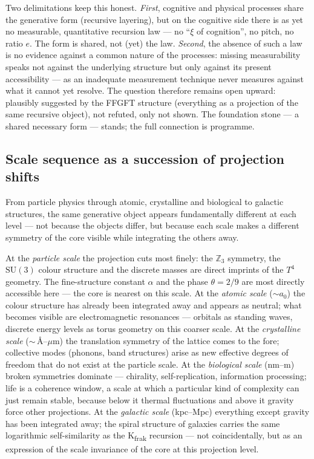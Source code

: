Two delimitations keep this honest. \emph{First}, cognitive and physical
processes share the generative form (recursive layering), but on the cognitive
side there is as yet no measurable, quantitative recursion law --- no
\enquote{$\xi$ of cognition}, no pitch, no ratio $e$. The form is shared, not
(yet) the law. \emph{Second}, the absence of such a law is no evidence against
a common nature of the processes: missing measurability speaks not against the
underlying structure but only against its present accessibility --- as an
inadequate measurement technique never measures against what it cannot yet
resolve. The question therefore remains open upward: plausibly suggested by
the FFGFT structure (everything as a projection of the same recursive object),
not refuted, only not shown. The foundation stone --- a shared necessary form
--- stands; the full connection is programme.

\subsection*{Scale sequence as a succession of projection shifts}

From particle physics through atomic, crystalline and biological to galactic
structures, the same generative object appears fundamentally different at each
level --- not because the objects differ, but because each scale makes a
different symmetry of the core visible while integrating the others away.

At the \emph{particle scale} the projection cuts most finely: the
$\mathbb{Z}_3$ symmetry, the $\mathrm{SU}(3)$ colour structure and the
discrete masses are direct imprints of the $T^4$ geometry. The fine-structure
constant $\alpha$ and the phase $\theta = 2/9$ are most directly accessible
here --- the core is nearest on this scale. At the \emph{atomic scale}
($\sim a_0$) the colour structure has already been integrated away and appears
as neutral; what becomes visible are electromagnetic resonances --- orbitals
as standing waves, discrete energy levels as torus geometry on this coarser
scale. At the \emph{crystalline scale} ($\sim$\,Å--$\mu$m) the translation
symmetry of the lattice comes to the fore; collective modes (phonons, band
structures) arise as new effective degrees of freedom that do not exist at the
particle scale. At the \emph{biological scale} (nm--m) broken symmetries
dominate --- chirality, self-replication, information processing; life is a
coherence window, a scale at which a particular kind of complexity can just
remain stable, because below it thermal fluctuations and above it gravity
force other projections. At the \emph{galactic scale} (kpc--Mpc) everything
except gravity has been integrated away; the spiral structure of galaxies
carries the same logarithmic self-similarity as the K\textsubscript{frak}
recursion --- not coincidentally, but as an expression of the scale invariance
of the core at this projection level.

